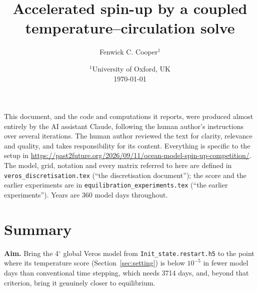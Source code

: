 \documentclass{article}
\title{Accelerated spin-up by a coupled temperature--circulation solve}
\author{Fenwick C. Cooper$^1$}
\date{%
    $^1$University of Oxford, UK \\[2ex]
    \today
}
\begin{document}
\maketitle

\tableofcontents

This document, and the code and computations it reports, were produced almost entirely by the AI assistant Claude, following the human author's instructions over several iterations. The human author reviewed the text for clarity, relevance and quality, and takes responsibility for its content. Everything is specific to the setup in \url{https://past2future.org/2026/09/11/ocean-model-spin-up-competition/}.
The model, grid, notation and every matrix referred to here are defined in \texttt{veros\_discretisation.tex} (``the discretisation document''); the score and the earlier experiments are in \texttt{equilibration\_experiments.tex} (``the earlier experiments'').
Years are 360 model days throughout.

\section{Summary}\label{sec:summary}

\textbf{Aim.} Bring the 4$^\circ$ global Veros model from \texttt{Init\_state.restart.h5} to the point where its temperature score (Section~\ref{sec:setting}) is below $10^{-5}$ in fewer model days than conventional time stepping, which needs 3714 days, and, beyond that criterion, bring it genuinely closer to equilibrium.
\end{document}
